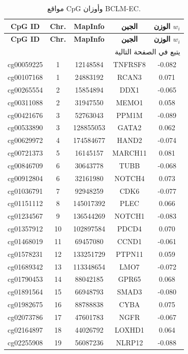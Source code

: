 \documentclass[11pt,a4paper]{article}
\begin{document}
	\begin{longtable}{|c|c|c|c|c|}
		\caption{مواقع CpG وأوزان BCLM-EC.}\label{tab:cpgs}\\
		\hline
		\textbf{CpG ID} & \textbf{Chr.} & \textbf{MapInfo} & \textbf{الجين} & \textbf{الوزن \(w_i\)} \\
		\hline
		\endfirsthead
		\hline
		\textbf{CpG ID} & \textbf{Chr.} & \textbf{MapInfo} & \textbf{الجين} & \textbf{الوزن \(w_i\)} \\
		\hline
		\endhead
		\hline
		\multicolumn{5}{r}{يتبع في الصفحة التالية}\\
		\endfoot
		\hline
		\endlastfoot
		cg00059225 & 1 & 12148584 & TNFRSF8 & -0.082 \\
		cg00107168 & 1 & 24883192 & RCAN3 & 0.071 \\
		cg00265554 & 2 & 15854894 & DDX1 & -0.065 \\
		cg00311088 & 2 & 31947550 & MEMO1 & 0.058 \\
		cg00421676 & 3 & 52763043 & PPM1M & -0.089 \\
		cg00533890 & 3 & 128855053 & GATA2 & 0.062 \\
		cg00629972 & 4 & 174584677 & HAND2 & -0.074 \\
		cg00721373 & 5 & 16145157 & MARCH11 & 0.081 \\
		cg00846709 & 6 & 30643778 & TUBB & -0.068 \\
		cg00912804 & 6 & 32161980 & NOTCH4 & 0.073 \\
		cg01036791 & 7 & 92948259 & CDK6 & -0.077 \\
		cg01151112 & 8 & 145017392 & PLEC & 0.066 \\
		cg01234567 & 9 & 136544269 & NOTCH1 & -0.083 \\
		cg01357912 & 10 & 102897584 & PDCD4 & 0.070 \\
		cg01468019 & 11 & 69457080 & CCND1 & -0.061 \\
		cg01578231 & 12 & 133251729 & PTPN11 & 0.059 \\
		cg01689342 & 13 & 113348654 & LMO7 & -0.072 \\
		cg01790453 & 14 & 88042185 & GPR65 & 0.068 \\
		cg01891564 & 15 & 66948793 & SMAD3 & -0.080 \\
		cg01982675 & 16 & 88788838 & CYBA & 0.075 \\
		cg02073786 & 17 & 47601783 & NGFR & -0.067 \\
		cg02164897 & 18 & 44026792 & LOXHD1 & 0.064 \\
		cg02255908 & 19 & 56087236 & NLRP12 & -0.088 \\

\end{longtable}
\end{document}
